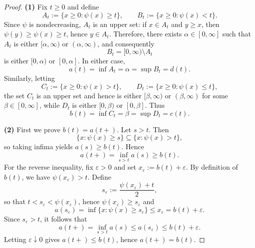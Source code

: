 \documentclass[12pt]{article}
\renewcommand{\(}{\left(}%
\renewcommand{\)}{\right)}%
\renewcommand{\[}{\left[}%
\renewcommand{\]}{\right]}%
\newtheorem{proof}{Proof.}}
\begin{document}
\begin{proof}
\textbf{(1)}
Fix $t\ge 0$ and define
\begin{equation*}
A_t:=\{x\ge 0:\psi(x)\ge t\},\qquad B_t:=\{x\ge 0:\psi(x)<t\}.
\end{equation*}
Since $\psi$ is nondecreasing, $A_t$ is an upper set: if $x\in A_t$ and $y\ge x$,
then $\psi(y)\ge \psi(x)\ge t$, hence $y\in A_t$.
Therefore, there exists $\alpha\in[0,\infty]$ such that $A_t$ is either
$[\alpha,\infty)$ or $(\alpha,\infty)$, and consequently
\begin{equation*}
B_t=[0,\infty)\setminus A_t
\end{equation*}
is either $[0,\alpha)$ or $[0,\alpha]$. In either case,
\begin{equation*}
a(t)=\inf A_t=\alpha=\sup B_t=d(t).
\end{equation*}
Similarly, letting
\begin{equation*}
C_t:=\{x\ge 0:\psi(x)>t\},\qquad D_t:=\{x\ge 0:\psi(x)\le t\},
\end{equation*}
the set $C_t$ is an upper set and hence is either $[\beta,\infty)$ or
$(\beta,\infty)$ for some $\beta\in[0,\infty]$, while $D_t$ is either
$[0,\beta)$ or $[0,\beta]$. Thus
\begin{equation*}
b(t)=\inf C_t=\beta=\sup D_t=c(t).
\end{equation*}

\medskip
\noindent \textbf{(2)}
First we prove $b(t)=a(t+)$. Let $s>t$. Then
\begin{equation*}
\{x:\psi(x)\ge s\}\subseteq \{x:\psi(x)>t\},
\end{equation*}
so taking infima yields $a(s)\ge b(t)$. Hence
\begin{equation*}
a(t+)=\inf_{s>t}a(s)\ge b(t).
\end{equation*}
For the reverse inequality, fix $\varepsilon>0$ and set $x_\varepsilon:=b(t)+\varepsilon$.
By definition of $b(t)$, we have $\psi(x_\varepsilon)>t$. Define
\begin{equation*}
s_\varepsilon:=\frac{\psi(x_\varepsilon)+t}{2},
\end{equation*}
so that $t<s_\varepsilon<\psi(x_\varepsilon)$, hence $\psi(x_\varepsilon)\ge s_\varepsilon$ and
\begin{equation*}
a(s_\varepsilon)=\inf\{x:\psi(x)\ge s_\varepsilon\}\le x_\varepsilon=b(t)+\varepsilon.
\end{equation*}
Since $s_\varepsilon>t$, it follows that
\begin{equation*}
a(t+)=\inf_{s>t}a(s)\le a(s_\varepsilon)\le b(t)+\varepsilon.
\end{equation*}
Letting $\varepsilon\downarrow 0$ gives $a(t+)\le b(t)$, hence $a(t+)=b(t)$.


\end{proof}
\end{document}
